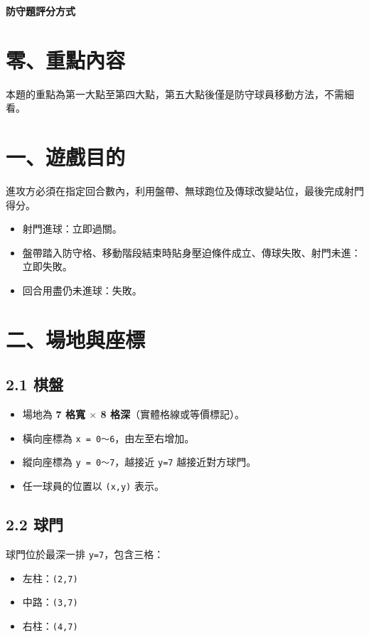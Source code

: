 \documentclass[11pt]{article}
\newcommand{\term}[1]{\textbf{#1}}
\newcommand{\coord}[1]{\texttt{#1}}
\begin{document}
{\LARGE\bfseries 防守題評分方式\par}
\vspace{0.8em}

\section*{零、重點內容}

本題的重點為第一大點至第四大點，第五大點後僅是防守球員移動方法，不需細看。

\section*{一、遊戲目的}

進攻方必須在指定回合數內，利用盤帶、無球跑位及傳球改變站位，最後完成射門得分。

\begin{itemize}
  \item 射門進球：立即過關。
  \item 盤帶踏入防守格、移動階段結束時貼身壓迫條件成立、傳球失敗、射門未進：立即失敗。
  \item 回合用盡仍未進球：失敗。
\end{itemize}

\section*{二、場地與座標}

\subsection*{2.1 棋盤}

\begin{itemize}
  \item 場地為 \term{7 格寬 $\times$ 8 格深}（實體格線或等價標記）。
  \item 橫向座標為 \coord{x = 0～6}，由左至右增加。
  \item 縱向座標為 \coord{y = 0～7}，越接近 \coord{y=7} 越接近對方球門。
  \item 任一球員的位置以 \coord{(x,y)} 表示。
\end{itemize}

\subsection*{2.2 球門}

球門位於最深一排 \coord{y=7}，包含三格：

\begin{itemize}
  \item 左柱：\coord{(2,7)}
  \item 中路：\coord{(3,7)}
  \item 右柱：\coord{(4,7)}
\end{itemize}
\end{document}
